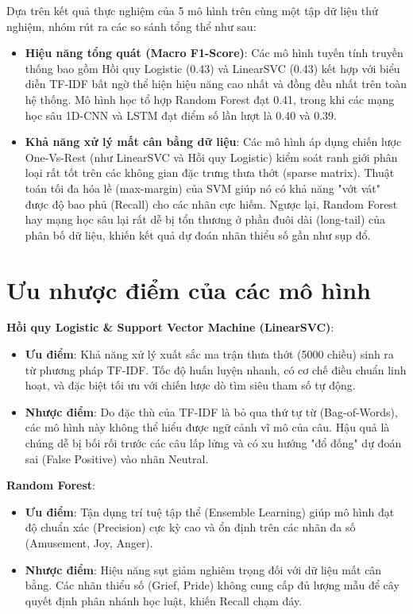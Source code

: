 Dựa trên kết quả thực nghiệm của 5 mô hình trên cùng một tập dữ liệu thử nghiệm, nhóm rút ra các so sánh tổng thể như sau:
\begin{itemize}
	\item \textbf{Hiệu năng tổng quát (Macro F1-Score)}: Các mô hình tuyến tính truyền thống bao gồm Hồi quy Logistic (0.43) và LinearSVC (0.43) kết hợp với biểu diễn TF-IDF bất ngờ thể hiện hiệu năng cao nhất và đồng đều nhất trên toàn hệ thống. Mô hình học tổ hợp Random Forest đạt 0.41, trong khi các mạng học sâu 1D-CNN và LSTM đạt điểm số lần lượt là 0.40 và 0.39.
	
	\item \textbf{Khả năng xử lý mất cân bằng dữ liệu}: Các mô hình áp dụng chiến lược One-Vs-Rest (như LinearSVC và Hồi quy Logistic) kiểm soát ranh giới phân loại rất tốt trên các không gian đặc trưng thưa thớt (sparse matrix). Thuật toán tối đa hóa lề (max-margin) của SVM giúp nó có khả năng "vớt vát" được độ bao phủ (Recall) cho các nhãn cực hiếm. Ngược lại, Random Forest hay mạng học sâu lại rất dễ bị tổn thương ở phần đuôi dài (long-tail) của phân bố dữ liệu, khiến kết quả dự đoán nhãn thiểu số gần như sụp đổ.
\end{itemize}

\section{Ưu nhược điểm của các mô hình}

\textbf{Hồi quy Logistic \& Support Vector Machine (LinearSVC)}:
\begin{itemize}
	\item \textbf{Ưu điểm}: Khả năng xử lý xuất sắc ma trận thưa thớt (5000 chiều) sinh ra từ phương pháp TF-IDF. Tốc độ huấn luyện nhanh, có cơ chế điều chuẩn linh hoạt, và đặc biệt tối ưu với chiến lược dò tìm siêu tham số tự động.
	
	\item \textbf{Nhược điểm}: Do đặc thù của TF-IDF là bỏ qua thứ tự từ (Bag-of-Words), các mô hình này không thể hiểu được ngữ cảnh vĩ mô của câu. Hậu quả là chúng dễ bị bối rối trước các câu lấp lửng và có xu hướng "đổ đống" dự đoán sai (False Positive) vào nhãn Neutral.
\end{itemize}

\textbf{Random Forest}:
\begin{itemize}
	\item \textbf{Ưu điểm}: Tận dụng trí tuệ tập thể (Ensemble Learning) giúp mô hình đạt độ chuẩn xác (Precision) cực kỳ cao và ổn định trên các nhãn đa số (Amusement, Joy, Anger).
	
	\item \textbf{Nhược điểm}: Hiệu năng sụt giảm nghiêm trọng đối với dữ liệu mất cân bằng. Các nhãn thiểu số (Grief, Pride) không cung cấp đủ lượng mẫu để cây quyết định phân nhánh học luật, khiến Recall chạm đáy.
\end{itemize}

